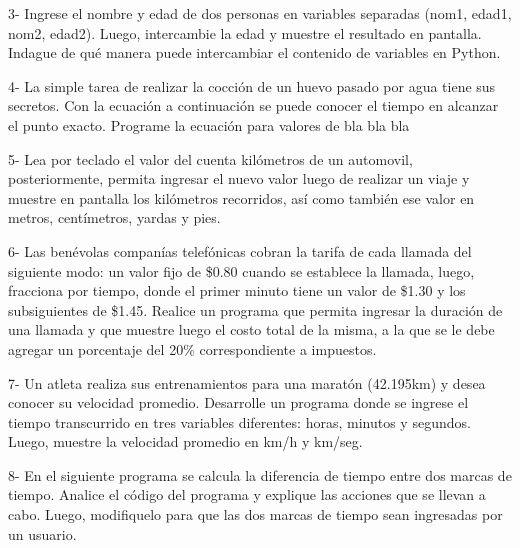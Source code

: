 \documentclass[a4paper,12pt,spanish]{sphinxmanual}
\begin{document}
3- Ingrese el nombre y edad de dos personas en variables separadas
(nom1, edad1, nom2, edad2). Luego, intercambie la edad y muestre el
resultado en pantalla. Indague de qué manera puede intercambiar el
contenido de variables en Python.

4- La simple tarea de realizar la cocción de un huevo pasado por agua
tiene sus secretos. Con la ecuación a continuación se puede conocer el
tiempo en alcanzar el punto exacto. Programe la ecuación para valores de
bla bla bla

5- Lea por teclado el valor del cuenta kilómetros de un automovil,
posteriormente, permita ingresar el nuevo valor luego de realizar un
viaje y muestre en pantalla los kilómetros recorridos, así como también
ese valor en metros, centímetros, yardas y pies.

6- Las benévolas companías telefónicas cobran la tarifa de cada llamada
del siguiente modo: un valor fijo de \$0.80 cuando se establece la
llamada, luego, fracciona por tiempo, donde el primer minuto tiene un
valor de \$1.30 y los subsiguientes de \$1.45. Realice un programa que
permita ingresar la duración de una llamada y que muestre luego el costo
total de la misma, a la que se le debe agregar un porcentaje del 20\%
correspondiente a impuestos.

7- Un atleta realiza sus entrenamientos para una maratón (42.195km) y
desea conocer su velocidad promedio. Desarrolle un programa donde se
ingrese el tiempo transcurrido en tres variables diferentes: horas,
minutos y segundos. Luego, muestre la velocidad promedio en km/h y
km/seg.

8- En el siguiente programa se calcula la diferencia de tiempo entre dos
marcas de tiempo. Analice el código del programa y explique las acciones
que se llevan a cabo. Luego, modifiquelo para que las dos marcas de
tiempo sean ingresadas por un usuario.
\end{document}
